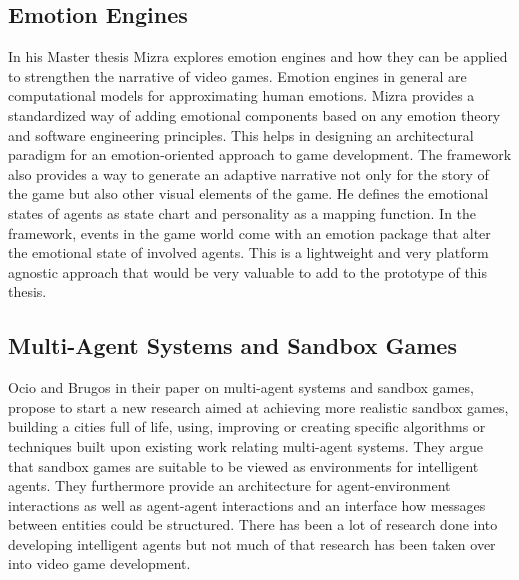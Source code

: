 \subsection{Emotion Engines}
\label{section:emotion}
In his Master thesis Mizra explores emotion engines and how they can be applied to strengthen the narrative of video games. Emotion engines in general are computational models for approximating human emotions. Mizra provides a standardized way of adding emotional components based on any emotion theory and software engineering principles. This helps in designing an architectural paradigm for an emotion-oriented approach to game development. The framework also provides a way to generate an adaptive narrative not only for the story of the game but also other visual elements of the game. He defines the emotional states of agents as state chart and personality as a mapping function. In the framework, events in the game world come with an emotion package that alter the emotional state of involved agents. This is a lightweight and very platform agnostic approach that would be very valuable to add to the prototype of this thesis.~\cite{Mizra2021}
\subsection{Multi-Agent Systems and Sandbox Games}
Ocio and Brugos in their paper on multi-agent systems and sandbox games, propose to start a new research aimed at achieving more realistic sandbox games, building a cities full of life, using, improving or creating specific algorithms or techniques built upon existing work relating multi-agent systems. They argue that sandbox games are suitable to be viewed as environments for intelligent agents. They furthermore provide an architecture for agent-environment interactions as well as agent-agent interactions and an interface how messages between entities could be structured. There has been a lot of research done into developing intelligent agents but not much of that research has been taken over into video game development.~\cite{Barriales2009}